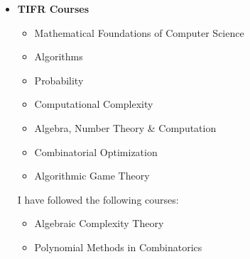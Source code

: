 \documentclass[a4paper,skipsamekey,11pt,english]{curve}
\begin{document}
\begin{itemize}
\begin{multicols}{2}
		      \textbf{Computer Science Courses:}{}
		      \begin{itemize}
			      \item Design and Analysis of Algorithms
			      \item Theory of Computation
			      \item Complexity Theory
			      \item Parallel Algorithms and Complexity
			      \item Expander Graphs and Application
			      \item Algorithmic Coding Theory (Two Parts)
			      \item Algebra \& Computation
			      \item Quantum Algorithmic Thinking
			      \item Quantum Information Theory
			      \item Functional Programming with Haskell
			      \item Advanced Programming with Python
			      \item Programming Language Concepts (Java, Concurrent Programming, Lambda Calculus)
		      \end{itemize}
	      \end{multicols}
	\item \textbf{TIFR Courses}
	      \begin{itemize}
		      \item Mathematical Foundations of Computer Science
		      \item Algorithms
		      \item Probability
		      \item Computational Complexity
		      \item Algebra, Number Theory \& Computation
		      \item Combinatorial Optimization
		      \item Algorithmic Game Theory
	      \end{itemize}
	      I have followed the following courses:
	      \begin{itemize}
		      \item Algebraic Complexity Theory
		      \item Polynomial Methods in Combinatorics
	      \end{itemize}
\end{itemize}
% 
\end{document}
